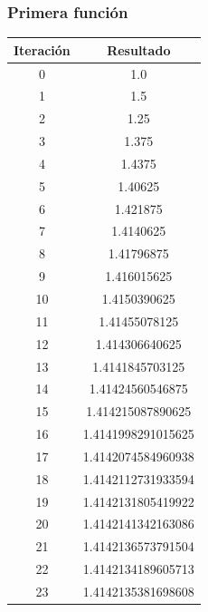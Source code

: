 \documentclass[titlepage,a4paper]{article}
\begin{document}
\subsubsection{Primera función}\label{sec:bis1}
\begin{multicols}{2}
\begin{center}
\begin{tabular}{| c | c |}
\hline
        Iteración & Resultado \\ \hline
0     &  1.0 \\
1     &  1.5 \\
2     &  1.25 \\
3     &  1.375 \\
4     &  1.4375 \\
5     &  1.40625 \\
6     &  1.421875 \\
7     &  1.4140625 \\
8     &  1.41796875 \\
9     &  1.416015625 \\
10     &  1.4150390625 \\
11     &  1.41455078125 \\
12     &  1.414306640625 \\
13     &  1.4141845703125 \\
14     &  1.41424560546875 \\
15     &  1.414215087890625 \\
16     &  1.4141998291015625 \\
17     &  1.4142074584960938 \\
18     &  1.4142112731933594 \\
19     &  1.4142131805419922 \\
20     &  1.4142141342163086 \\
21     &  1.4142136573791504 \\
22     &  1.4142134189605713 \\
23     &  1.4142135381698608 \\
\hline
\end{tabular}
\end{center}


\end{multicols}
\end{document}
